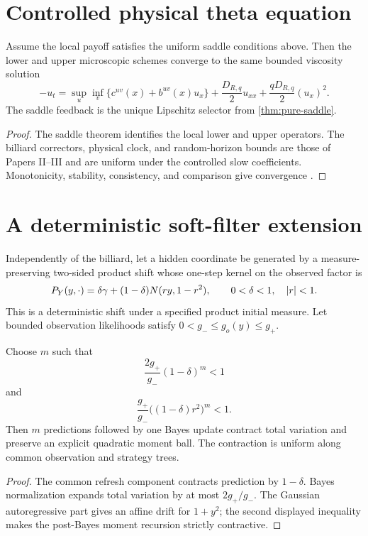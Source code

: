 \section{Controlled physical theta equation}\label{sec:hjb}
\begin{theorem}\label{thm:controlled-limit}
Assume the local payoff satisfies the uniform saddle conditions above.  Then
the lower and upper microscopic schemes converge to the same bounded viscosity
solution
\[
 -u_t
 =\sup_u\inf_v\{c^{uv}(x)+b^{uv}(x)u_x\}
 +\frac{D_{R,q}}2u_{xx}
 +\frac{qD_{R,q}}2(u_x)^2.
\]
The saddle feedback is the unique Lipschitz selector from
\cref{thm:pure-saddle}.
\end{theorem}
\begin{proof}
The saddle theorem identifies the local lower and upper operators.  The
billiard correctors, physical clock, and random-horizon bounds are those of
Papers II--III and are uniform under the controlled slow coefficients.
Monotonicity, stability, consistency, and comparison give convergence
\cite{FlemingSoner2006,CrandallIshiiLions1992}.
\end{proof}

\section{A deterministic soft-filter extension}\label{sec:filter}
Independently of the billiard, let a hidden coordinate be generated by a
measure-preserving two-sided product shift whose one-step kernel on the
observed factor is
\[
 P_Y(y,\cdot)=\delta\gamma+(1-\delta)N(ry,1-r^2),
 \qquad0<\delta<1,\quad\left\lvert r\right\rvert<1.
\]
This is a deterministic shift under a specified product initial measure.  Let
bounded observation likelihoods satisfy $0<g_-\le g_o(y)\le g_+$.

\begin{theorem}\label{thm:filter}
Choose $m$ such that
\[
 \frac{2g_+}{g_-}(1-\delta)^m<1
\]
and
\[
 \frac{g_+}{g_-}\bigl((1-\delta)r^2\bigr)^m<1.
\]
Then $m$ predictions followed by one Bayes update contract total variation and
preserve an explicit quadratic moment ball.  The contraction is uniform along
common observation and strategy trees.
\end{theorem}
\begin{proof}
The common refresh component contracts prediction by $1-\delta$.  Bayes
normalization expands total variation by at most $2g_+/g_-$.  The Gaussian
autoregressive part gives an affine drift for $1+y^2$; the second displayed
inequality makes the post-Bayes moment recursion strictly contractive.
\end{proof}
